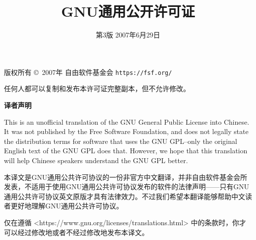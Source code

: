 \documentclass[11pt]{article}
\title{GNU通用公开许可证}
\date{第3版 \space 2007年6月29日}
\begin{document}
\maketitle

\begin{center}
{\parindent 0in

版权所有 \copyright\  2007年 自由软件基金会 \texttt{https://fsf.org/}

\bigskip
任何人都可以复制和发布本许可证完整副本，但不允许修改。}

\end{center}
\begin{center}
  {\bf\large 译者声明}
\end{center}

This is an unofficial translation of the GNU General Public License into Chinese. It was not published by the Free Software Foundation, and does not legally state the distribution terms for software that uses the GNU GPL--only the original English text of the GNU GPL does that. However, we hope that this translation will help Chinese speakers understand the GNU GPL better.

本译文是GNU通用公共许可协议的一份非官方中文翻译，并非自由软件基金会所发表，不适用于使用GNU通用公共许可协议发布的软件的法律声明——只有GNU通用公共许可协议英文原版才具有法律效力。不过我们希望本翻译能够帮助中文读者更好地理解GNU通用公共许可协议。

仅在遵循 <https://www.gnu.org/licenses/translations.html> 中的条款时，你才可以经过修改地或者不经过修改地发布本译文。

\pagebreak
\end{document}
